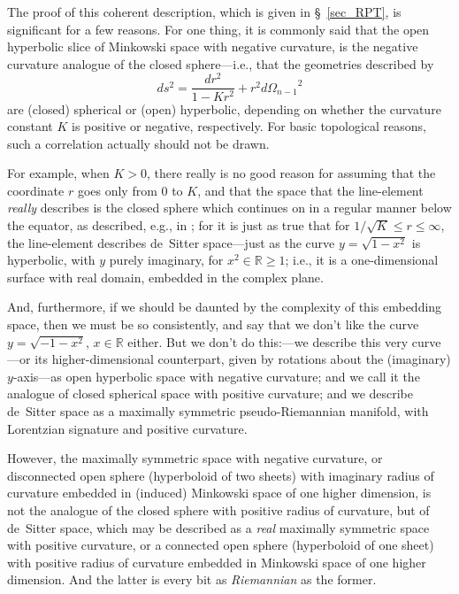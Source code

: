 The proof of this coherent description, which is given in \S~\ref{sec_RPT}, is significant for a few reasons. For one thing, it is commonly said that the open hyperbolic slice of Minkowski space with negative curvature, is the negative curvature analogue of the closed sphere---i.e., that the geometries described by
\begin{equation}
ds^2=\frac{dr^2}{1-Kr^2}+r^2{d\Omega_{n-1}}^2
\end{equation}
are (closed) spherical or (open) hyperbolic, depending on whether the curvature constant $K$ is positive or negative, respectively. For basic topological reasons, such a correlation actually should not be drawn.

For example, when $K>0$, there really is no good reason for assuming that the coordinate $r$ goes only from 0 to $K$, and that the space that the line-element \textit{really} describes is the closed sphere which continues on in a regular manner below the equator, as described, e.g., in \cite{Weinberg1972}; for it is just as true that for $1/\sqrt{K}\leq{r}\leq\infty$, the line-element describes de~Sitter space---just as the curve $y=\sqrt{1-x^2}$ is hyperbolic, with $y$ purely imaginary, for $x^2\in\mathbb{R}\geq1$; i.e., it is a one-dimensional surface with real domain, embedded in the complex plane.

And, furthermore, if we should be daunted by the complexity of this embedding space, then we must be so consistently, and say that we don't like the curve $y=\sqrt{-1-x^2}$, $x\in\mathbb{R}$ either. But we don't do this:---we describe this very curve---or its higher-dimensional counterpart, given by rotations about the (imaginary) $y$-axis---as open hyperbolic space with negative curvature; and we call it the analogue of closed spherical space with positive curvature; and we describe de~Sitter space as a maximally symmetric pseudo-Riemannian manifold, with Lorentzian signature and positive curvature.

However, the maximally symmetric space with negative curvature, or disconnected open sphere (hyperboloid of two sheets) with imaginary radius of curvature embedded in (induced) Minkowski space of one higher dimension, is not the analogue of the closed sphere with positive radius of curvature, but of de~Sitter space, which may be described as a \textit{real} maximally symmetric space with positive curvature, or a connected open sphere (hyperboloid of one sheet) with positive radius of curvature embedded in Minkowski space of one higher dimension. And the latter is every bit as \textit{Riemannian} as the former. 

